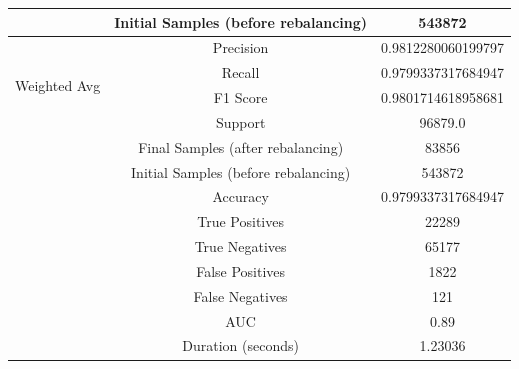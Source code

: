 \begin{longtable}{|c|c|c|}
 & Initial Samples (before rebalancing) & 543872 \\
\hline
\multirow{4}{*}{Weighted Avg} & Precision & 0.9812280060199797 \\
 & Recall & 0.9799337317684947 \\
 & F1 Score & 0.9801714618958681 \\
 & Support & 96879.0 \\
 & Final Samples (after rebalancing) & 83856 \\
 & Initial Samples (before rebalancing) & 543872 \\
\hline
& Accuracy & 0.9799337317684947 \\ \hline
& True Positives & 22289 \\ \hline
& True Negatives & 65177 \\ \hline
& False Positives & 1822 \\ \hline
& False Negatives & 121 \\ \hline
& AUC & 0.89 \\ \hline
& Duration (seconds) & 1.23036 \\ \hline
\end{longtable}


